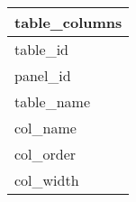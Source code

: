 \documentclass{article}
\begin{document}

\begin{tabular}{|l|} \hline
\textbf{table\_columns} \\ \hline
table\_id \\ \hline
panel\_id \\ \hline
table\_name \\ \hline
col\_name \\ \hline
col\_order \\ \hline
col\_width \\ \hline
\end{tabular}
\end{document}
